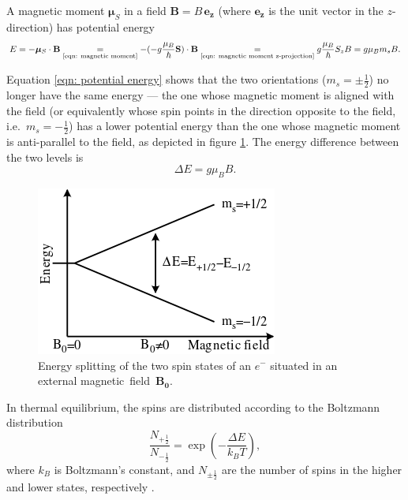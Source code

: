 \documentclass[a4paper]{jpconf}
\numberwithin{equation}{section}
\begin{document}
A magnetic moment $\bm{\mu}_S$ in a field $\mathbf{B} = B \, \mathbf{e_z}$ (where $\mathbf{e_z}$ is the unit vector in the $z$-direction) has potential energy
\begin{equation}
	E = - \bm{\mu}_S \cdot \mathbf{B} \underset{\text{\eqref{eqn: magnetic moment}}}{=}  - (- g \frac{\mu_B}{\hbar} \mathbf{S})\cdot\mathbf{B}
	  \underset{\text{\eqref{eqn: magnetic moment z-projection}}}{=} g \frac{\mu_B}{\hbar}S_z B 
	  = g\mu_Bm_sB \label{eqn: potential energy}.
\end{equation}

Equation \eqref{eqn: potential energy} shows that the two orientations ($m_s = \pm\tfrac12$) no longer have the same energy --- the one whose magnetic moment is aligned with the field (or equivalently whose spin points in the direction opposite to the field, i.e.\ $m_s = -\tfrac12$) has a lower potential energy than the one whose magnetic moment is anti-parallel to the field, as depicted in figure \ref{fig: energy splitting}. The energy difference between the two levels is 
\begin{equation}
	\Delta E = g \mu_B B. \label{eqn: energy difference}
\end{equation}

\begin{figure}[htbp]
	\includegraphics[scale=0.75]{EPR_splitting.png}
	\hspace{2pc}
	\begin{minipage}[b]{3in}
		\caption{Energy splitting of the two spin states of an $e^-$ situated in an external magnetic~field~$\mathbf{B_0}$.}
		\label{fig: energy splitting}
	\end{minipage}
\end{figure}

In thermal equilibrium, the spins are distributed according to the Boltzmann distribution
\[
    \frac{N_{+\tfrac12}}{N_{-\tfrac12}} = \exp(- \frac{\Delta E}{k_B T}),
\]
where $k_B$ is Boltzmann\textquoteright s constant, and $N_{\pm\tfrac12}$ are the number of spins in the higher and lower states, respectively \cite{Gero}. 
\end{document}
